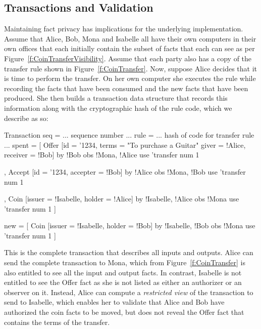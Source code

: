 \subsection{Transactions and Validation}
\label{s:Transactions}
Maintaining fact privacy has implications for the underlying implementation. Assume that Alice, Bob, Mona and Isabelle all have their own computers in their own offices that each initially contain the subset of facts that each can see as per Figure~\ref{f:CoinTransferVisibility}. Assume that each party also has a copy of the transfer rule shown in Figure~\ref{f:CoinTransfer}. Now, suppose Alice decides that it is time to perform the transfer. On her own computer she executes the rule while recording the facts that have been consumed and the new facts that have been produced. She then builds a transaction data structure that records this information along with the cryptographic hash of the rule code, which we describe as so:

\begin{small}
\begin{code}
Transaction
 seq   = ... sequence number ...
 rule  = ... hash of code for transfer rule ...
 spent = [ Offer [id = '1234, terms = "To purchase a Guitar"
                  giver = !Alice, receiver = !Bob]
           by  {!Bob}              obs {!Mona, !Alice}
           use {'transfer}         num   1

         , Accept [id = '1234, accepter = !Bob]
           by  {!Alice}            obs {!Mona, !Bob}
           use {'transfer}         num 1

         , Coin   [issuer = !Isabelle, holder = !Alice]
           by  {!Isabelle, !Alice} obs {!Mona}
           use {'transfer}         num 1 ]

 new   = [ Coin   [issuer = !Isabelle, holder = !Bob]
           by  {!Isabelle, !Bob}   obs {!Mona}
           use {'transfer}         num 1 ]
\end{code}
\end{small}

This is the complete transaction that describes all inputs and outputs. Alice can send the complete transaction to Mona, which from Figure~\ref{f:CoinTransfer} is also entitled to see all the input and output facts. In contrast, Isabelle is not entitled to see the Offer fact as she is not listed as either an authorizer or an observer on it. Instead, Alice can compute a \emph{restricted view} of the transaction to send to Isabelle, which enables her to validate that Alice and Bob have authorized the coin facts to be moved, but does not reveal the Offer fact that contains the terms of the transfer.

